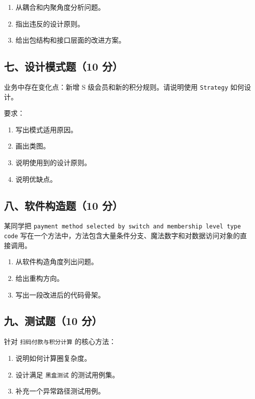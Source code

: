 \documentclass[UTF8,zihao=-4]{ctexart}
\begin{document}
\begin{enumerate}
\item 从耦合和内聚角度分析问题。
\item 指出违反的设计原则。
\item 给出包结构和接口层面的改进方案。
\end{enumerate}


\subsection{七、设计模式题（10 分）}


业务中存在变化点：新增 S 级会员和新的积分规则。请说明使用 \texttt{Strategy} 如何设计。


要求：


\begin{enumerate}
\item 写出模式适用原因。
\item 画出类图。
\item 说明使用到的设计原则。
\item 说明优缺点。
\end{enumerate}


\subsection{八、软件构造题（10 分）}


某同学把 \texttt{payment method selected by switch and membership level type code} 写在一个方法中，方法包含大量条件分支、魔法数字和对数据访问对象的直接调用。


\begin{enumerate}
\item 从软件构造角度列出问题。
\item 给出重构方向。
\item 写出一段改进后的代码骨架。
\end{enumerate}


\subsection{九、测试题（10 分）}


针对 \texttt{扫码付款与积分计算} 的核心方法：


\begin{enumerate}
\item 说明如何计算圈复杂度。
\item 设计满足 \texttt{黑盒测试} 的测试用例集。
\item 补充一个异常路径测试用例。
\end{enumerate}
\end{document}
